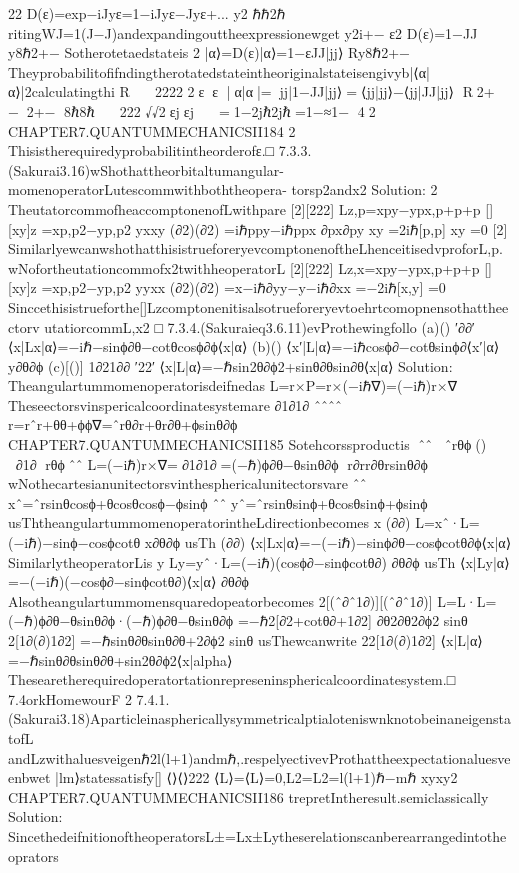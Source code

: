 {{{{{{{{{{22
D(ε)=exp−iJyε=1−iJyε−Jyε+...
y2
ℏℏ2ℏ
ritingWJ=1(J−J)andexpandingouttheexpressionewget
y2i+−
ε2
D(ε)=1−JJ
y8ℏ2+−
Sotherotetaedstateis
2
|α⟩=D(ε)|α⟩=1−εJJ|jj⟩
Ry8ℏ2+−
Theyprobabilitofifndingtherotatedstateintheoriginalstateisengivyb|⟨α|α⟩|2calculatingthi
R

2222
2εε
|⟨α|α⟩|=⟨jj|1−JJ|jj⟩=⟨jj|jj⟩−⟨jj|JJ|jj⟩
R2+−2+−
8ℏ8ℏ

222
√√2εjεj

=1−2jℏ2jℏ=1−≈1−
42
CHAPTER7.QUANTUMMECHANICSII184
2
Thisistherequiredyprobabilitintheorderofε.□
7.3.3.(Sakurai3.16)wShothattheorbitaltumangular-momenoperatorLutescommwithboththeopera-
torsp2andx2
Solution:
2
TheutatorcommofheaccomptonenofLwithpare
[2][222]
Lz,p=xpy−ypx,p+p+p
[][xy]z
=xp,p2−yp,p2
yxxy
(∂2)(∂2)
=iℏppy−iℏppx
∂px∂py
xy
=2iℏ[p,p]
xy
=0
[2]
SimilarlyewcanwshothatthisistrueforeryevcomptonenoftheLhenceitisedvproforL,p.
wNofortheutationcommofx2twithheoperatorL
[2][222]
Lz,x=xpy−ypx,p+p+p
[][xy]z
=xp,p2−yp,p2
yyxx
(∂2)(∂2)
=x−iℏ∂yy−y−iℏ∂xx
=−2iℏ[x,y]
=0
Sinccethisistrueforthe[]Lzcomptonenitisalsotrueforeryevtoehrtcomopnensothattheectorv
utatiorcommL,x2
□
7.3.4.(Sakuraieq3.6.11)evProthewingfollo
(a)()
′∂∂′
⟨x|Lx|α⟩=−iℏ−sinϕ∂θ−cotθcosϕ∂ϕ⟨x|α⟩
(b)()
⟨x′|L|α⟩=−iℏcosϕ∂−cotθsinϕ∂⟨x′|α⟩
y∂θ∂ϕ
(c)[()]
1∂21∂∂
′22′
⟨x|L|α⟩=−ℏsin2θ∂ϕ2+sinθ∂θsin∂θ⟨x|α⟩
Solution:
Theangulartummomenoperatorisdeifnedas
L=r×P=r×(−iℏ∇)=(−iℏ)r×∇
Theseectorsvinspericalcoordinatesystemare
∂1∂1∂
ˆˆˆˆ
r=rˆr+θθ+ϕϕ∇=ˆrθ∂r+θr∂θ+ϕsinθ∂ϕ
CHAPTER7.QUANTUMMECHANICSII185
Sotehcorssproductis
ˆˆ
ˆrθϕ()
∂1∂
rθϕˆˆ
L=(−iℏ)r×∇=∂1∂1∂=(−ℏ)ϕ∂θ−θsinθ∂ϕ
r∂rr∂θrsinθ∂ϕ
wNothecartesianunitectorsvinthesphericalunitectorsvare
ˆˆ
xˆ=ˆrsinθcosϕ+θcosθcosϕ−ϕsinϕ
ˆˆ
yˆ=ˆrsinθsinϕ+θcosθsinϕ+ϕsinϕ
usThtheangulartummomenoperatorintheLdirectionbecomes
x
(∂∂)
L=xˆ·L=(−iℏ)−sinϕ−cosϕcotθ
x∂θ∂ϕ
usTh
(∂∂)
⟨x|Lx|α⟩=−(−iℏ)−sinϕ∂θ−cosϕcotθ∂ϕ⟨x|α⟩
SimilarlytheoperatorLis
y
Ly=yˆ·L=(−iℏ)(cosϕ∂−sinϕcotθ∂)
∂θ∂ϕ
usTh
⟨x|Ly|α⟩=−(−iℏ)(−cosϕ∂−sinϕcotθ∂)⟨x|α⟩
∂θ∂ϕ
Alsotheangulartummomensquaredopeatorbecomes
2[(ˆ∂ˆ1∂)][(ˆ∂ˆ1∂)]
L=L·L=(−ℏ)ϕ∂θ−θsinθ∂ϕ·(−ℏ)ϕ∂θ−θsinθ∂ϕ
=−ℏ2[∂2+cotθ∂+1∂2]
∂θ2∂θ2∂ϕ2
sinθ
2[1∂(∂)1∂2]
=−ℏsinθ∂θsinθ∂θ+2∂ϕ2
sinθ
usThewcanwrite
22[1∂(∂)1∂2]
⟨x|L|α⟩=−ℏsinθ∂θsinθ∂θ+sin2θ∂ϕ2⟨x|alpha⟩
Thesearetherequiredoperatortationrepreseninsphericalcoordinatesystem.□
7.4orkHomewourF
2
7.4.1.(Sakurai3.18)AparticleinasphericallysymmetricalptialoteniswnknotobeinaneigenstatofL
andLzwithaluesveigenℏ2l(l+1)andmℏ,.respelyectivevProthattheexpectationaluesveenbwet
|lm⟩statessatisfy[]
⟨⟩⟨⟩222
⟨L⟩=⟨L⟩=0,L2=L2=l(l+1)ℏ−mℏ
xyxy2
CHAPTER7.QUANTUMMECHANICSII186
trepretIntheresult.semiclassically
Solution:
SincethedeifnitionoftheoperatorsL±=Lx±Lytheserelationscanberearrangedintotheoprators
}}}}}}}}}}
